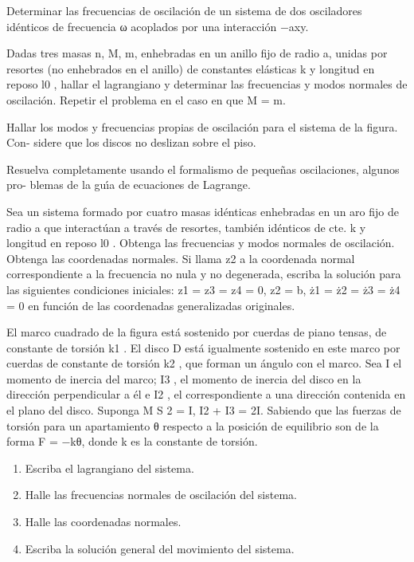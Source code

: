 \documentclass[10pt,oneside]{CBFT_book}
\begin{document}
\begin{ejercicios}
\label{ej6}
\item{ \bf }
Determinar las frecuencias de oscilación de un sistema de dos osciladores idénticos de
frecuencia ω acoplados por una interacción −axy.


\label{ej7}
\item{ \bf }
Dadas tres masas n, M, m, enhebradas en un anillo fijo de radio a, unidas por resortes
(no enhebrados en el anillo) de constantes elásticas k y longitud en reposo l0 , hallar el
lagrangiano y determinar las frecuencias y modos normales de oscilación. Repetir el
problema en el caso en que M = m.


\label{ej8}
\item{ \bf }
Hallar los modos y frecuencias propias de oscilación para el sistema de la figura. Con-
sidere que los discos no deslizan sobre el piso.

\label{ej9}
\item{ \bf }
Resuelva completamente usando el formalismo de pequeñas oscilaciones, algunos pro-
blemas de la guı́a de ecuaciones de Lagrange.


\label{ej10}
\item{ \bf }
Sea un sistema formado por cuatro masas idénticas enhebradas en un aro fijo de radio
a que interactúan a través de resortes, también idénticos de cte. k y longitud en reposo
l0 . Obtenga las frecuencias y modos normales de oscilación. Obtenga las coordenadas
normales. Si llama z2 a la coordenada normal correspondiente a la frecuencia no
nula y no degenerada, escriba la solución para las siguientes condiciones iniciales:
z1 = z3 = z4 = 0, z2 = b, ż1 = ż2 = ż3 = ż4 = 0 en función de las coordenadas
generalizadas originales.

\label{ej11}
\item{ \bf }
El marco cuadrado de la figura está sostenido por cuerdas de piano tensas, de constante
de torsión k1 . El disco D está igualmente sostenido en este marco por cuerdas de
constante de torsión k2 , que forman un ángulo con el marco. Sea I el momento de
inercia del marco; I3 , el momento de inercia del disco en la dirección perpendicular a
él e I2 , el correspondiente a una dirección contenida en el plano del disco. Suponga
M S 2 = I, I2 + I3 = 2I. Sabiendo que las fuerzas de torsión para un apartamiento θ
respecto a la posición de equilibrio son de la forma F = −kθ, donde k es la constante
de torsión.
\begin{enumerate}[label=(\alph*)]
\item Escriba el lagrangiano del sistema.
\item Halle las frecuencias normales de oscilación del sistema.
\item Halle las coordenadas normales.
\item Escriba la solución general del movimiento del sistema.
\end{enumerate}


\end{ejercicios}
\end{document}
